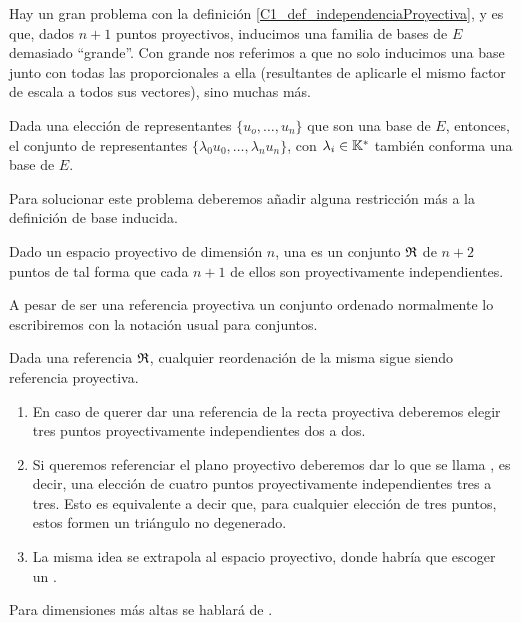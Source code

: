 Hay un gran problema con la definición \ref{C1_def_independenciaProyectiva}, y es que, dados $n+1$ puntos proyectivos, inducimos una familia de bases de $E$ demasiado ``grande''. Con grande nos referimos a que no solo inducimos una base junto con todas las proporcionales a ella (resultantes de aplicarle el mismo factor de escala a todos sus vectores), sino muchas más.
\begin{obs}
	\label{C1_obs_noUnicidadBase}
	Dada una elección de representantes $\{u_o,\dots,u_n\}$ que son una base de $E$, entonces, el conjunto de representantes $\{\lambda_0u_0,\dots,\lambda_nu_n\}$, con $\lambda_i\in\mathbb{K}^*$ también conforma una base de $E$.
\end{obs}

Para solucionar este problema deberemos añadir alguna restricción más a la definición de base inducida.
\begin{defi}
	\label{C1_def_refereciaProyectiva}
	Dado un espacio proyectivo de dimensión $n$, una  es un conjunto  $\mathfrak{R}$ de $n+2$ puntos de tal forma que cada $n+1$ de ellos son proyectivamente independientes. 
\end{defi}

A pesar de ser una referencia proyectiva un conjunto ordenado normalmente lo escribiremos con la notación usual para conjuntos.

\begin{obs}[Reordenación]
	\label{C1_obs_reordenacionReferencias}
	Dada una referencia $\mathfrak{R}$, cualquier reordenación de la misma sigue siendo referencia proyectiva.
\end{obs} 

\begin{exa}
	\label{C1_exa_dimensionesBajas}
	\begin{enumerate}
		\item En caso de querer dar una referencia de la recta proyectiva deberemos elegir tres puntos proyectivamente independientes dos a dos.
		\item Si queremos referenciar el plano proyectivo deberemos dar lo que se llama , es decir, una elección de cuatro puntos proyectivamente independientes tres a tres. Esto es equivalente a decir que, para cualquier elección de tres puntos, estos formen un triángulo no degenerado.
		\item La misma idea se extrapola al espacio proyectivo, donde habría que escoger un .
	\end{enumerate}
	Para dimensiones más altas se hablará de .
\end{exa}
